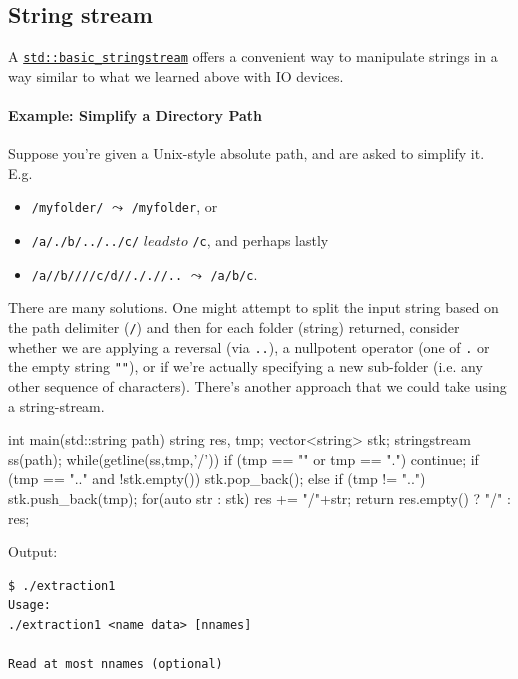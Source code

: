 \documentclass[12pt,letterpaper,twoside]{article}
\begin{document}
\subsection{String stream}
A \href{https://en.cppreference.com/w/cpp/io/basic_stringstream}
{\texttt{std::basic\_stringstream}} offers a convenient way to manipulate strings 
in a way similar to what we learned above with IO devices.

\paragraph{Example: Simplify a Directory Path} Suppose you're given a Unix-style absolute path, and are asked to simplify it. E.g. 
\begin{itemize} \item \texttt{/myfolder/} $\leadsto$ \texttt{/myfolder}, or
\item \texttt{/a/./b/../../c/} $leadsto$ \texttt{/c}, and perhaps lastly 
\item \texttt{/a//b////c/d//././/..} $\leadsto$ \texttt{/a/b/c}.   \end{itemize}
There are many solutions. One might attempt to split the input string 
based on the path delimiter (\texttt{/}) and then for each 
folder (string) returned, consider whether we are applying a 
reversal (via \texttt{..}), a nullpotent operator (one of \texttt{.} or the empty string 
\texttt{""}), or 
if we're actually specifying a new sub-folder (i.e. any other sequence of characters).
There's another approach that we could take using a string-stream.

\begin{cpp}
int main(std::string path) {     string res, tmp;     vector<string> stk;     stringstream ss(path);     while(getline(ss,tmp,'/')) {         if (tmp == "" or tmp == ".")      continue;         if (tmp == ".." and !stk.empty()) stk.pop_back();         else if (tmp != "..")             stk.push_back(tmp);     }     for(auto str : stk) res += "/"+str;     return res.empty() ? "/" : res; }
\end{cpp}

Output:

\begin{verbatim}
$ ./extraction1
Usage:
./extraction1 <name data> [nnames]

Read at most nnames (optional)
\end{verbatim}
\end{document}
